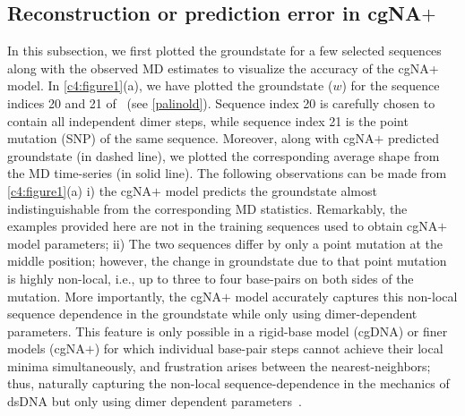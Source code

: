 \subsection{Reconstruction or prediction error in cgNA$+$}
In this subsection, we first plotted the groundstate for a few selected sequences along with the observed MD estimates to visualize the accuracy of the cgNA+ model.
In \cref{c4:figure1}(a), we have plotted the groundstate ($w$) for the sequence indices 20 and 21 of \Lbdna \ (see \cref{palinold}). 
Sequence index 20 is carefully chosen to contain all independent dimer steps, while sequence index 21 is the point mutation (SNP) of the same sequence.
Moreover, along with cgNA$+$ predicted groundstate (in dashed line), we plotted the corresponding average shape from the MD time-series (in solid line).
The following observations can be made from \cref{c4:figure1}(a)
i) the cgNA$+$ model predicts the groundstate almost indistinguishable from the corresponding MD statistics. 
Remarkably, the examples provided here are not in the training sequences used to obtain cgNA$+$ model parameters;
ii) The two sequences differ by only a point mutation at the middle position; however, the change in groundstate due to that point mutation is highly non-local, i.e., up to three to four base-pairs on both sides of the mutation. 
More importantly, the cgNA$+$ model accurately captures this non-local sequence dependence in the groundstate while only using dimer-dependent parameters. 
This feature is only possible in a rigid-base model (cgDNA) or finer models (cgNA$+$) for which individual base-pair steps cannot achieve their local minima simultaneously, and frustration arises between the nearest-neighbors; thus, naturally capturing the non-local sequence-dependence in the mechanics of dsDNA but only using dimer dependent parameters~\cite{cgDNA1,petkevivciute2014cgdna,patelithesis}.

